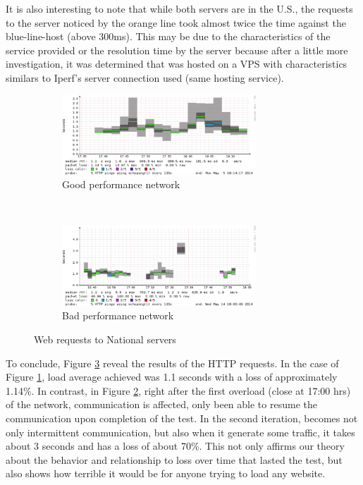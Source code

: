 It is also interesting to note that while both servers are in the U.S., the
requests to the server noticed by the orange line took almost twice the time
against the blue-line-host  (above 300ms). This may be due to the
characteristics of the service provided or the resolution time by the server
because after a little more investigation, it was determined that was hosted
on a VPS with characteristics similars to Iperf's server connection used (same
hosting service).

\begin{figure}
\begin{subfigure}{\textwidth}
\centering
    \includegraphics[width=0.8\textwidth]{img/smoke_inf_good}
\caption[Smokeping: Web requests with good performance]{Good performance network}
\label{fig:smokewebgood}
\end{subfigure}%
\\
\begin{subfigure}{\textwidth}
\centering
    \includegraphics[width=0.8\textwidth]{img/smoke_inf_bad}
\caption[Smokeping: Web requests with bad performance]{Bad performance network}
\label{fig:smokewebbad}
\end{subfigure}
\caption[Smokeping: Web requests to National servers]{Web requests to National servers}
\label{fig:smokeweb}
\end{figure}

To conclude, Figure \ref{fig:smokeweb}  reveal the results of the HTTP
requests. In the case of Figure \ref{fig:smokewebgood}, load average achieved
was 1.1 seconds  with a loss of approximately 1.14\%. In contrast, in Figure
\ref{fig:smokewebbad}, right after the first overload (close at 17:00 hrs) of
the network, communication is affected, only been able to resume the
communication upon completion of the test. In the second iteration, becomes
not only intermittent communication, but also when it generate some traffic,
it takes about 3 seconds and has a loss of about 70\%. This not only affirms
our theory about the behavior and relationship to loss over time that lasted
the test, but also shows how terrible it would be for anyone trying to load
any website.
